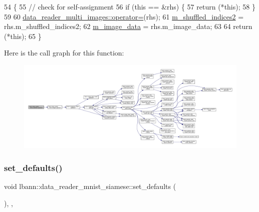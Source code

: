 \begin{DoxyCode}
54                                                                                                     \{
55   \textcolor{comment}{// check for self-assignment}
56   \textcolor{keywordflow}{if} (\textcolor{keyword}{this} == &rhs) \{
57     \textcolor{keywordflow}{return} (*\textcolor{keyword}{this});
58   \}
59 
60   \hyperlink{classlbann_1_1data__reader__multi__images_a8d9eae4dde10654c1f1bf7c1fe685e99}{data\_reader\_multi\_images::operator=}(rhs);
61   \hyperlink{classlbann_1_1data__reader__mnist__siamese_a42a4b1513a7305cc62d219ac0d9473c3}{m\_shuffled\_indices2} = rhs.m\_shuffled\_indices2;
62   \hyperlink{classlbann_1_1data__reader__mnist__siamese_a5b664a53047546c1be6d19ecabbd30dc}{m\_image\_data} = rhs.m\_image\_data;
63 
64   \textcolor{keywordflow}{return} (*\textcolor{keyword}{this});
65 \}
\end{DoxyCode}
Here is the call graph for this function\+:\nopagebreak
\begin{figure}[H]
\begin{center}
\leavevmode
\includegraphics[width=350pt]{classlbann_1_1data__reader__mnist__siamese_ad41517c9c789bbf8d7e0696832e52d98_cgraph}
\end{center}
\end{figure}
\mbox{\label{classlbann_1_1data__reader__mnist__siamese_a7e1c9530b5d56a0835db8a30af980164}} 
\subsubsection{\texorpdfstring{set\+\_\+defaults()}{set\_defaults()}}
{\footnotesize\ttfamily void lbann\+::data\+\_\+reader\+\_\+mnist\+\_\+siamese\+::set\+\_\+defaults (\begin{DoxyParamCaption}{ }\end{DoxyParamCaption})\hspace{0.3cm}{\ttfamily [override]}, {\ttfamily [protected]}, {\ttfamily [virtual]}}

